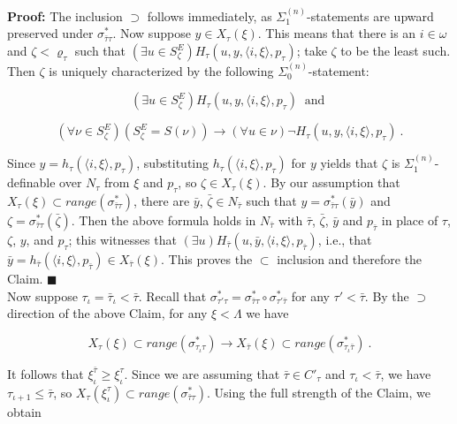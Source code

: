 \documentclass[12pt]{article}
\begin{document}
\textbf{Proof:}  The inclusion $\supset$ follows immediately, as $\Sigma_1^{(n)}$-statements are upward preserved under $\sigma_{\bar{\tau} \tau}^*$.  Now suppose $y \in X_\tau (\xi)$.  This means that there is an $i \in \omega$ and $\zeta < \varrho_\tau$ such that $( \exists u \in S^E_\zeta ) H_\tau ( u , y , \langle i , \xi \rangle , p_\tau )$; take $\zeta$ to be the least such.  Then $\zeta$ is uniquely characterized by the following $\Sigma_0^{(n)}$-statement:

\[
( \exists u \in S_\zeta^E ) H_\tau ( u , y, \langle i , \xi \rangle , p_\tau ) \ \text{ and }
\]

\[
( \forall \nu \in S_\zeta^E ) (S_\zeta^E = S ( \nu )) \longrightarrow ( \forall u \in \nu ) \neg H_\tau ( u, y, \langle i , \xi \rangle , p_\tau ) \ .
\]

Since $y = h_\tau ( \langle i, \xi \rangle , p_\tau )$, substituting $h_\tau ( \langle i , \xi \rangle , p_\tau )$ for $y$ yields that $\zeta$ is $\Sigma_1^{(n)}$-definable over $N_\tau$ from $\xi$ and $p_\tau$, so $\zeta \in X_\tau (\xi )$.  By our assumption that $X_\tau (\xi) \subset range (\sigma_{\bar{\tau} \tau}^*)$, there are $\bar{y}$, $\bar{\zeta} \in N_{\bar{\tau}}$ such that $y = \sigma_{\bar{\tau} \tau}^* (\bar{y})$ and $\zeta = \sigma_{\bar{\tau} \tau}^* (\bar{\zeta})$.  Then the above formula holds in $N_{\bar{\tau}}$ with $\bar{\tau}$, $\bar{\zeta}$, $\bar{y}$ and $p_{\bar{\tau}}$ in place of $\tau$, $\zeta$, $y$, and $p_{\tau}$; this witnesses that $(\exists u ) H_{\bar{\tau}} ( u, \bar{y}, \langle i , \xi \rangle , p_{\bar{\tau}} )$, i.e., that $\bar{y} = h_{\bar{\tau}} ( \langle i , \xi \rangle , p_{\bar{\tau}} ) \in X_{\bar{\tau}} (\xi)$.  This proves the $\subset$ inclusion and therefore the Claim.  $\blacksquare$\\


Now suppose $\tau_\iota = \bar{\tau}_\iota < \bar{\tau}$.  Recall that $\sigma_{{\tau'} \tau}^* = \sigma_{\bar{\tau} \tau}^* \circ \sigma_{\tau'  \bar{\tau} }^*$ for any $\tau' < \bar{\tau}$.  By the $\supset$ direction of the above Claim, for any $\xi < \Lambda$ we have

\[
X_\tau ( \xi ) \subset range (\sigma_{{\tau_\iota} \tau}^* ) \longrightarrow X_{\bar{\tau}} (\xi ) \subset range ( \sigma_{\tau_\iota \bar{\tau}}^*) \ .
\]

It follows that $\xi_\iota^{\bar{\tau}} \geq \xi_\iota^\tau$.  Since we are assuming that $\bar{\tau} \in C'_\tau$ and $\tau_\iota < \bar{\tau}$, we have $\tau_{\iota + 1} \leq \bar{\tau}$, so $X_\tau ( \xi_\iota^\tau ) \subset range (\sigma_{\bar{\tau} \tau}^*)$.  Using the full strength of the Claim, we obtain
\end{document}
